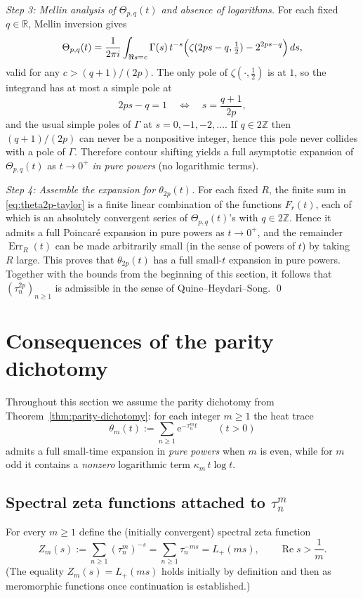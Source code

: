 \documentclass[11pt,letterpaper]{amsart}
\numberwithin{equation}{section}
\theoremstyle{definition}
\newcommand{\Ree}{\operatorname{Re}}
\newcommand{\e}{\mathrm{e}}
\newcommand{\Err}{\operatorname{Err}}
\begin{document}
\medskip
\noindent\emph{Step 3: Mellin analysis of $\Theta_{p,q}(t)$ and absence of logarithms.}
For each fixed $q\in\mathbb{R}$, Mellin inversion gives
\[
\Theta_{p,q}(t)=\frac{1}{2\pi i}\int_{\Re s=c}\Gamma(s)\,t^{-s}
\Bigl(\zeta(2ps-q,\tfrac12)-2^{2ps-q}\Bigr)\,ds,
\]
valid for any $c>(q+1)/(2p)$.
The only pole of $\zeta(\cdot,\tfrac12)$ is at $1$, so the integrand has at most a simple pole at
\[
2ps-q=1 \quad\Longleftrightarrow\quad s=\frac{q+1}{2p},
\]
and the usual simple poles of $\Gamma$ at $s=0,-1,-2,\dots$.
If $q\in2\mathbb{Z}$ then $(q+1)/(2p)$ can never be a nonpositive integer, hence this pole
never collides with a pole of $\Gamma$. Therefore contour shifting yields a full asymptotic
expansion of $\Theta_{p,q}(t)$ as $t\to0^+$ \emph{in pure powers} (no logarithmic terms).

\medskip
\noindent\emph{Step 4: Assemble the expansion for $\theta_{2p}(t)$.}
For each fixed $R$, the finite sum in \eqref{eq:theta2p-taylor} is a finite linear combination of the
functions $F_r(t)$, each of which is an absolutely convergent series of $\Theta_{p,q}(t)$'s with
$q\in2\mathbb{Z}$. Hence it admits a full Poincar\'e expansion in pure powers as $t\to0^+$,
and the remainder $\Err_R(t)$ can be made arbitrarily small (in the sense of powers of $t$)
by taking $R$ large. This proves that $\theta_{2p}(t)$ has a full small-$t$ expansion in pure powers.
Together with the bounds from the beginning of this section, it follows that $(\tau_n^{2p})_{n\ge1}$
is admissible in the sense of Quine--Heydari--Song.
\qed

\section{Consequences of the parity dichotomy}\label{sec:parity-consequences}

Throughout this section we assume the parity dichotomy from Theorem~\ref{thm:parity-dichotomy}:
for each integer $m\ge1$ the heat trace
\[
\theta_m(t):=\sum_{n\ge1}\e^{-\tau_n^m t}\qquad(t>0)
\]
admits a full small-time expansion in \emph{pure powers} when $m$ is even, while for $m$ odd it contains
a \emph{nonzero} logarithmic term $\kappa_m\,t\log t$.

\subsection{Spectral zeta functions attached to $\tau_n^m$}

For every $m\ge1$ define the (initially convergent) spectral zeta function
\begin{equation}\label{eq:def-Zm}
Z_m(s):=\sum_{n\ge1}(\tau_n^m)^{-s}=\sum_{n\ge1}\tau_n^{-ms}=L_+(ms),
\qquad \Ree s>\frac1m.
\end{equation}
(The equality $Z_m(s)=L_+(ms)$ holds initially by definition and then as meromorphic functions once
continuation is established.)
\end{document}

